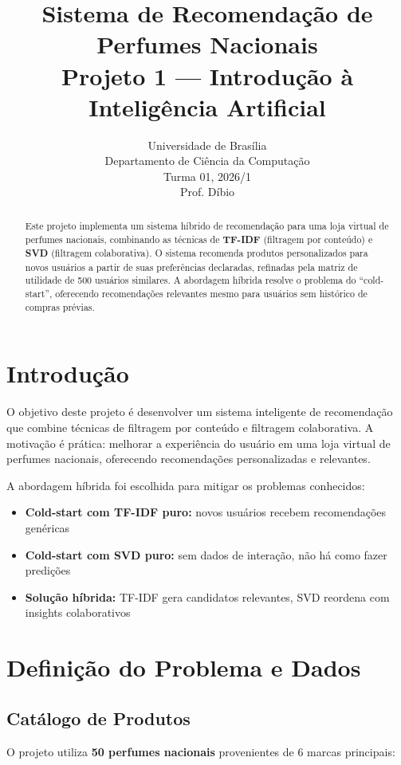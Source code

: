 \documentclass[12pt,a4paper]{article}
\title{\textbf{Sistema de Recomendação de Perfumes Nacionais} \\ 
       \large Projeto 1 --- Introdução à Inteligência Artificial}
\author{}
\date{Universidade de Brasília \\ Departamento de Ciência da Computação \\ Turma 01, 2026/1 \\ Prof. Díbio}
\begin{document}
\maketitle

\begin{abstract}
Este projeto implementa um sistema híbrido de recomendação para uma loja virtual de perfumes nacionais, combinando as técnicas de \textbf{TF-IDF} (filtragem por conteúdo) e \textbf{SVD} (filtragem colaborativa). O sistema recomenda produtos personalizados para novos usuários a partir de suas preferências declaradas, refinadas pela matriz de utilidade de 500 usuários similares. A abordagem híbrida resolve o problema do ``cold-start'', oferecendo recomendações relevantes mesmo para usuários sem histórico de compras prévias.
\end{abstract}

\section{Introdução}

O objetivo deste projeto é desenvolver um sistema inteligente de recomendação que combine técnicas de filtragem por conteúdo e filtragem colaborativa. A motivação é prática: melhorar a experiência do usuário em uma loja virtual de perfumes nacionais, oferecendo recomendações personalizadas e relevantes.

A abordagem híbrida foi escolhida para mitigar os problemas conhecidos:
\begin{itemize}
    \item \textbf{Cold-start com TF-IDF puro:} novos usuários recebem recomendações genéricas
    \item \textbf{Cold-start com SVD puro:} sem dados de interação, não há como fazer predições
    \item \textbf{Solução híbrida:} TF-IDF gera candidatos relevantes, SVD reordena com insights colaborativos
\end{itemize}

\section{Definição do Problema e Dados}

\subsection{Catálogo de Produtos}

O projeto utiliza \textbf{50 perfumes nacionais} provenientes de 6 marcas principais:
\end{document}

